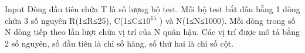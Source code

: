 Input
Dòng đầu tiên chứa T là số lượng bộ test. Mỗi bộ test bắt đầu bằng 1 dòng chứa 3 số nguyên R(1≤R≤25), C(1≤C≤$10^{15}$    ) và N(1≤N≤1000). Mỗi dòng trong số N dòng tiếp theo lần lượt chứa vị trí của N quân hậu. Các vị trí được mô tả bằng 2 số nguyên, số đầu tiên là chỉ số hàng, số thứ hai là chỉ số cột.